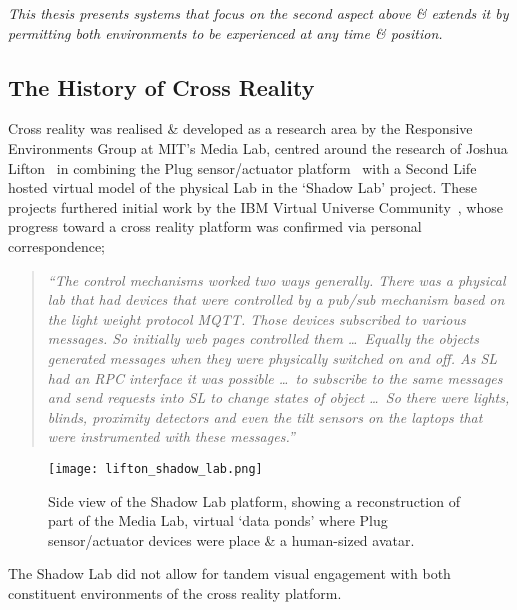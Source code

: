 \textit{This thesis presents systems that focus on the second aspect above \& extends it by permitting both environments to be experienced at any time \& position.}


\subsection{The History of Cross Reality}

Cross reality was realised \& developed as a research area by the Responsive Environments Group at MIT's Media Lab, centred around the research of Joshua Lifton~\cite{Lifton2007a} in combining the Plug sensor/actuator platform~\cite{Lifton2007b} with a Second Life hosted virtual model of the physical Lab in the `Shadow Lab' project. These projects furthered initial work by the IBM Virtual Universe Community~\cite{Hughes2006, Hughes2006a,Hughes2006b}, whose progress toward a cross reality platform was confirmed via personal correspondence;

\begin{quote}
\textit{``The control mechanisms worked two ways generally. There was a physical lab that had devices that were controlled by a pub/sub mechanism based on the light weight protocol MQTT. Those devices subscribed to various messages. So initially web pages controlled them \ldots\ Equally the objects generated messages when they were physically switched on and off. As SL had an RPC interface it was possible \ldots\ to subscribe to the same messages and send requests into SL to change states of object \ldots\ So there were lights, blinds, proximity detectors and even the tilt sensors on the laptops that were instrumented with these messages.''}
\end{quote}

\begin{figure}[h]
\centering
\texttt{[image: lifton\_shadow\_lab.png]}
\caption{Side view of the Shadow Lab platform, showing a reconstruction of part of the Media Lab, virtual `data ponds' where Plug sensor/actuator devices were place \& a human-sized avatar.}
\label{lifton_shadow_lab.png}
\end{figure}

The Shadow Lab did not allow for tandem visual engagement with both constituent environments of the cross reality platform.

